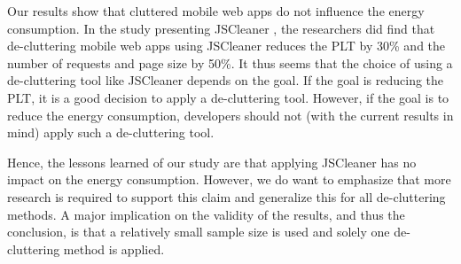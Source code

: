 Our results show that cluttered mobile web apps do not influence the energy consumption. In the study presenting JSCleaner \cite{chaqfeh2020jscleaner}, the researchers did find that de-cluttering mobile web apps using JSCleaner reduces the PLT by 30\% and the number of requests and page size by 50\%. It thus seems that the choice of using a de-cluttering tool like JSCleaner depends on the goal. If the goal is reducing the PLT, it is a good decision to apply a de-cluttering tool. However, if the goal is to reduce the energy consumption, developers should not (with the current results in mind) apply such a de-cluttering tool.

Hence, the lessons learned of our study are that applying JSCleaner has no impact on the energy consumption. However, we do want to emphasize that more research is required to support this claim and generalize this for all de-cluttering methods. A major implication on the validity of the results, and thus the conclusion, is that a relatively small sample size is used and solely one de-cluttering method is applied. 


